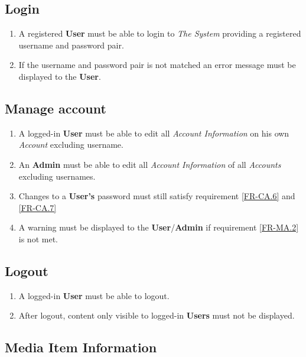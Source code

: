 \subsection {Login}
	
\begin{enumerate}[label=FR-\twodigits*, resume]
	\item A registered \textbf{User} must be able to login to \textit{The System} providing a registered username and password pair.
	\item If the username and password pair is not matched an error message must be displayed to the \textbf{User}. 
\end{enumerate}
		
\subsection {Manage account}

\begin{enumerate}[label=FR-\twodigits*, resume]
	\item A logged-in \textbf{User} must be able to edit all \textit{Account Information} on his own \textit{Account} excluding username.
	\item An \textbf{Admin} must be able to edit all \textit{Account Information} of all \textit{Accounts} excluding usernames.
	\item Changes to a \textbf{User's} password must still satisfy requirement \ref{FR-CA.6} and \ref{FR-CA.7} \label{FR-MA.2}
	\item A warning must be displayed to the \textbf{User}/\textbf{Admin} if requirement \ref{FR-MA.2} is not met.	
\end{enumerate}
		
\subsection {Logout}
\begin{enumerate}[label=FR-\twodigits*, resume]
	\item A logged-in \textbf{User} must be able to logout.
	\item After logout, content only visible to logged-in \textbf{Users} must not be displayed.
\end{enumerate}
	
\subsection {Media Item Information} \label{FR-Media}

